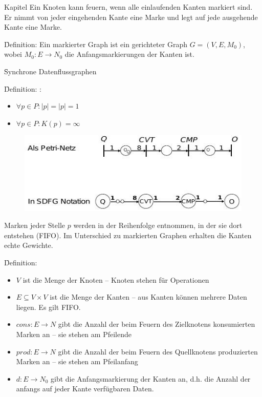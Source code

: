 \begin{chapter}{Kapitel}
Ein Knoten kann feuern, wenn alle einlaufenden Kanten markiert sind. Er nimmt von jeder eingehenden Kante eine Marke und legt auf jede ausgehende Kante eine Marke. 

\noindent \f{Definition}: Ein markierter Graph ist ein gerichteter Graph $G=(V,E,M_0)$, wobei $M_0:E\rightarrow N_0$ die Anfangsmarkierungen der Kanten ist. 
\vspace*{6pt}

\f{Synchrone Datenflussgraphen}
\vspace*{3pt}

\noindent \f{Definition}: :
\begin{itemize}
 \item $\forall p\in P: |$\textbullet$p| = |p$\textbullet$| = 1$
 \item $\forall p\in P:K(p)=\infty$
\end{itemize}
\begin{figure}[!ht]
 \centering
 \includegraphics[scale=0.8]{pics/sdfg}
\end{figure}
\newpage
\noindent Marken jeder Stelle $p$ werden in der Reihenfolge entnommen, in der sie dort entstehen (FIFO). Im Unterschied zu markierten Graphen erhalten die Kanten echte 
Gewichte.

\f{Definition}: 
\begin{itemize}
 \item $V$ ist die Menge der Knoten -- Knoten stehen für Operationen
 \item $E\subseteq V\times V$ ist die Menge der Kanten -- aus Kanten können mehrere Daten liegen. Es gilt FIFO.
 \item $cons:E\rightarrow N$ gibt die Anzahl der beim Feuern des Zielknotens konsumierten Marken an -- sie stehen am Pfeilende
 \item $prod:E\rightarrow N$ gibt die Anzahl der beim Feuern des Quellknotens produzierten Marken an -- sie stehen am Pfeilanfang
 \item $d:E\rightarrow N_0$ gibt die Anfangsmarkierung der Kanten an, d.h. die Anzahl der anfangs auf jeder Kante verfügbaren Daten. 
\end{itemize}


\end{chapter}
